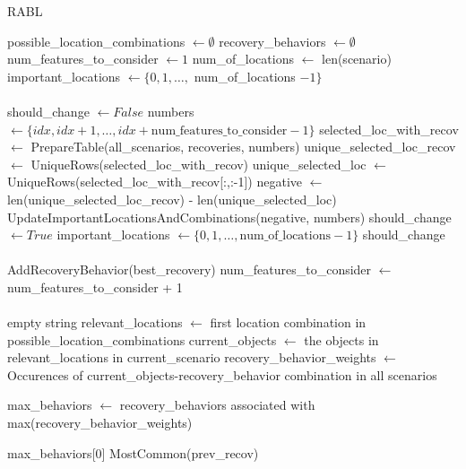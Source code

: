 \documentclass{article}
\begin{document}
\begin{algorithm}[H]
\caption{RABL}
\label{alg:refactored}
\begin{algorithmic}
    \State possible\_location\_combinations $\gets \emptyset$
    \State recovery\_behaviors $\gets \emptyset$
    \State num\_features\_to\_consider $\gets 1$
    \State num\_of\_locations $\gets$ len(scenario)
    \State important\_locations $\gets \{0, 1, \dots ,$ num\_of\_locations $- 1\}$
\EndProcedure
\hline
\\\\
    \State should\_change $\gets False$
            \Statex
                \State numbers $\gets \{idx, idx + 1, \dots , idx + \text{num\_features\_to\_consider} - 1\}$
                \State selected\_loc\_with\_recov $\gets$ PrepareTable(all\_scenarios, recoveries, numbers)
                \State unique\_selected\_loc\_recov $\gets$ UniqueRows(selected\_loc\_with\_recov)
                \State unique\_selected\_loc $\gets$ UniqueRows(selected\_loc\_with\_recov[:,:-1])
                \State negative $\gets$ len(unique\_selected\_loc\_recov) - len(unique\_selected\_loc)
                \State UpdateImportantLocationsAndCombinations(negative, numbers)
            \EndFor
        \Else
            \State should\_change $\gets True$
            \State important\_locations $\gets \{0, 1, \dots , \text{num\_of\_locations} - 1\}$
        \EndIf
    \EndIf
    \Return should\_change
\EndProcedure
\hline
\\\\
    \State AddRecoveryBehavior(best\_recovery)
        \State num\_features\_to\_consider $\gets$ num\_features\_to\_consider + 1
    \EndIf
\EndProcedure
\hline
\\\\
        \Return empty string
    \EndIf
    \State relevant\_locations $\gets$ first location combination in possible\_location\_combinations
    \State current\_objects $\gets$ the objects in relevant\_locations in current\_scenario
    \State recovery\_behavior\_weights $\gets$ Occurences of current\_objects-recovery\_behavior combination in all scenarios

    \State max\_behaviors $\gets$ recovery\_behaviors associated with max(recovery\_behavior\_weights)
    
        \Return max\_behaviors[0]
    \Else{}
        \Return MostCommon(prev\_recov)
    \EndIf
\EndProcedure
\end{algorithmic}
\end{algorithm}
\end{document}
